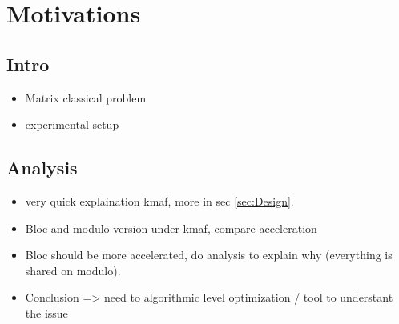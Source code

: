 \section{Motivations}
\label{sec:motivations}

\subsection{Intro}
\label{sec:motivations-intro}

\begin{itemize}
    \item Matrix classical problem
    \item experimental setup
\end{itemize}
\subsection{Analysis}
\label{sec:motivations-analysis}

\begin{itemize}
    \item very quick explaination kmaf, more in sec \ref{sec:Design}.
    \item Bloc and modulo version under kmaf, compare acceleration
    \item Bloc should be more accelerated, do analysis to explain why
        (everything is shared on modulo).
    \item  Conclusion => need to algorithmic level optimization / tool to
        understant the issue
\end{itemize}

